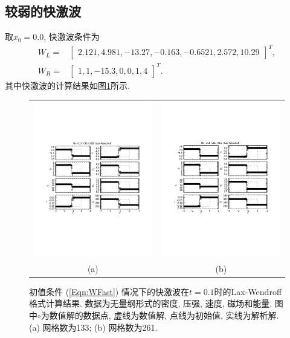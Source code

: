 \documentclass[10.5pt
]{article}
\begin{document}
\subsection{较弱的快激波}
取$x_0 = 0.0$, 快激波条件为
\begin{align}
W_L =& \left[\begin{array}{cccccc}
2.121,
4.981,
-13.27,
-0.163,
-0.6521,
2.572,
10.29
\end{array}\right]^T,
\nonumber\\
W_R =& \left[\begin{array}{ccccccc}
1,
1,
-15.3,
0,
0,
1,
4
\end{array}\right]^T. \label{Eqn:WFast}
\end{align}
其中快激波的计算结果如图\ref{Fig:WFast}所示.
\begin{figure}[htb]
\begin{center}
\begin{tabular}{cc}
\includegraphics[width=.45\textwidth]{hw4_lw_1f1.pdf}&
\includegraphics[width=.45\textwidth]{hw4_lw_1f2.pdf}
\\
(a)&(b)
\end{tabular}
\caption{初值条件 (\ref{Eqn:WFast}) 情况下的快激波在$t = 0.1$时的Lax-Wendroff格式计算结果. 数据为无量纲形式的密度, 压强, 速度, 磁场和能量. 图中$\circ$为数值解的数据点, 虚线为数值解, 点线为初始值, 实线为解析解. (a) 网格数为133; (b) 网格数为261.} \label{Fig:WFast}
\end{center}
\end{figure}
\end{document}
